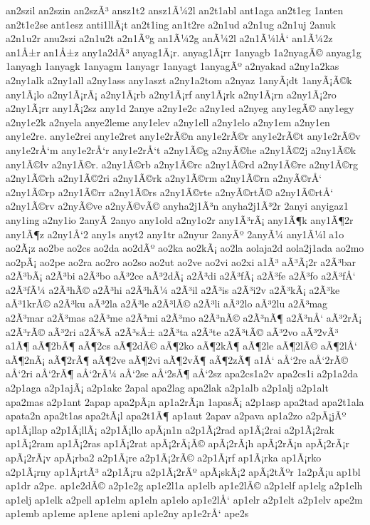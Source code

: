 {an2szil
an2szin
an2szÃ³
ansz1t2
ansz1Ã¼2l
an2t1abl
ant1aga
an2t1eg
1anten
an2t1e2se
ant1esz
anti1llÃ¡t
an2t1ing
an1t2re
a2n1ud
a2n1ug
a2n1uj
2anuk
a2n1u2r
anu2szi
a2n1u2t
a2n1Ãºg
an1Ã¼2g
anÃ¼2l
a2n1Ã¼lÅ‘
an1Ã¼2z
an1Å±r
an1Å±z
any1a2dÃ³
anyag1Ã¡r.
anyag1Ã¡rr
1anyagb
1a2nyagÃ©
anyag1g
1anyagh
1anyagk
1anyagm
1anyagr
1anyagt
1anyagÃº
a2nyakad
a2ny1a2kas
a2ny1alk
a2ny1all
a2ny1ass
any1aszt
a2ny1a2tom
a2nyaz
1anyÃ¡dt
1anyÃ¡Ã©k
any1Ã¡lo
a2ny1Ã¡rÃ¡
a2ny1Ã¡rb
a2ny1Ã¡rf
any1Ã¡rk
a2ny1Ã¡rn
a2ny1Ã¡2ro
a2ny1Ã¡rr
any1Ã¡2sz
any1d
2anye
a2ny1e2c
a2ny1ed
a2nyeg
any1egÃ©
any1egy
a2ny1e2k
a2nyela
anye2leme
any1elev
a2ny1ell
a2ny1elo
a2ny1em
a2ny1en
any1e2re.
any1e2rei
any1e2ret
any1e2rÃ©n
any1e2rÃ©r
any1e2rÃ©t
any1e2rÃ©v
any1e2rÅ‘m
any1e2rÅ‘r
any1e2rÅ‘t
a2ny1Ã©g
a2nyÃ©he
a2ny1Ã©2j
a2ny1Ã©k
any1Ã©lv
a2ny1Ã©r.
a2ny1Ã©rb
a2ny1Ã©rc
a2ny1Ã©rd
a2ny1Ã©re
a2ny1Ã©rg
a2ny1Ã©rh
a2ny1Ã©2ri
a2ny1Ã©rk
a2ny1Ã©rm
a2ny1Ã©rn
a2nyÃ©rÅ‘
a2ny1Ã©rp
a2ny1Ã©rr
a2ny1Ã©rs
a2ny1Ã©rte
a2nyÃ©rtÃ©
a2ny1Ã©rtÅ‘
a2ny1Ã©rv
a2nyÃ©ve
a2nyÃ©vÃ©
anyha2j1Ã³n
anyha2j1Ã³2r
2anyi
anyigaz1
any1ing
a2ny1io
2anyÃ­
2anyo
any1old
a2ny1o2r
any1Ã³rÃ¡
any1Ã¶k
any1Ã¶2r
any1Ã¶z
a2ny1Å‘2
any1s
anyt2
any1tr
a2nyur
2anyÃº
2anyÃ¼
any1Ã¼l
a1o
ao2Ã¡z
ao2be
ao2cs
ao2da
ao2dÃº
ao2ka
ao2kÃ¡
ao2la
aolaja2d
aola2j1ada
ao2mo
ao2pÃ¡
ao2pe
ao2ra
ao2ro
ao2so
ao2ut
ao2ve
ao2vi
ao2xi
a1Ã³
aÃ³Ã¡2r
a2Ã³bar
a2Ã³bÃ¡
a2Ã³bi
a2Ã³bo
aÃ³2ce
aÃ³2dÃ¡
a2Ã³di
a2Ã³fÃ¡
a2Ã³fe
a2Ã³fo
a2Ã³fÅ‘
a2Ã³fÃ¼
a2Ã³hÃ©
a2Ã³hi
a2Ã³hÃ¼
a2Ã³il
a2Ã³is
a2Ã³i2v
a2Ã³kÃ¡
a2Ã³ke
aÃ³1krÃ©
a2Ã³ku
aÃ³2la
a2Ã³le
a2Ã³lÃ©
a2Ã³li
aÃ³2lo
aÃ³2lu
a2Ã³mag
a2Ã³mar
a2Ã³mas
a2Ã³me
a2Ã³mi
a2Ã³mo
a2Ã³nÃ©
a2Ã³nÃ¶
a2Ã³nÅ‘
aÃ³2rÃ¡
a2Ã³rÃ©
aÃ³2ri
a2Ã³sÃ­
a2Ã³sÅ±
a2Ã³ta
a2Ã³te
a2Ã³tÃ©
aÃ³2vo
aÃ³2vÃ³
a1Ã¶
aÃ¶2bÃ¶
aÃ¶2cs
aÃ¶2dÃ©
aÃ¶2ko
aÃ¶2kÃ¶
aÃ¶2le
aÃ¶2lÃ©
aÃ¶2lÅ‘
aÃ¶2nÃ¡
aÃ¶2rÃ¶
aÃ¶2ve
aÃ¶2vi
aÃ¶2vÃ¶
aÃ¶2zÃ¶
a1Å‘
aÅ‘2re
aÅ‘2rÃ©
aÅ‘2ri
aÅ‘2rÃ¶
aÅ‘2rÃ¼
aÅ‘2se
aÅ‘2sÃ¶
aÅ‘2sz
apa2cs1a2v
apa2cs1i
a2p1a2da
a2p1aga
a2p1ajÃ¡
a2p1akc
2apal
apa2lag
apa2lak
a2p1alb
a2p1alj
a2p1alt
apa2mas
a2p1ant
2apap
apa2pÃ¡n
ap1a2rÃ¡n
1apasÃ¡
a2p1asp
apa2tad
apa2t1ala
apata2n
apa2t1as
apa2tÃ¡l
apa2t1Ã¶
ap1aut
2apav
a2pava
ap1a2zo
a2pÃ¡jÃº
ap1Ã¡llap
a2p1Ã¡llÃ¡
a2p1Ã¡llo
apÃ¡n1n
a2p1Ã¡2rad
ap1Ã¡2rai
a2p1Ã¡2rak
ap1Ã¡2ram
ap1Ã¡2ras
ap1Ã¡2rat
apÃ¡2rÃ¡Ã©
apÃ¡2rÃ¡h
apÃ¡2rÃ¡n
apÃ¡2rÃ¡r
apÃ¡2rÃ¡v
apÃ¡rba2
a2p1Ã¡re
a2p1Ã¡2rÃ©
a2p1Ã¡rf
ap1Ã¡rka
ap1Ã¡rko
a2p1Ã¡rny
ap1Ã¡rtÃ³
a2p1Ã¡ru
a2p1Ã¡2rÃº
apÃ¡skÃ¡2
apÃ¡2tÃºr
1a2pÃ¡u
ap1bl
ap1dr
a2pe.
ap1e2dÃ©
a2p1e2g
ap1e2l1a
ap1elb
ap1e2lÃ©
a2p1elf
ap1elg
a2p1elh
ap1elj
ap1elk
a2pell
ap1elm
ap1eln
ap1elo
ap1e2lÅ‘
ap1elr
a2p1elt
a2p1elv
ape2m
ap1emb
ap1eme
ap1ene
ap1eni
ap1e2ny
ap1e2rÅ‘
ape2s
}
